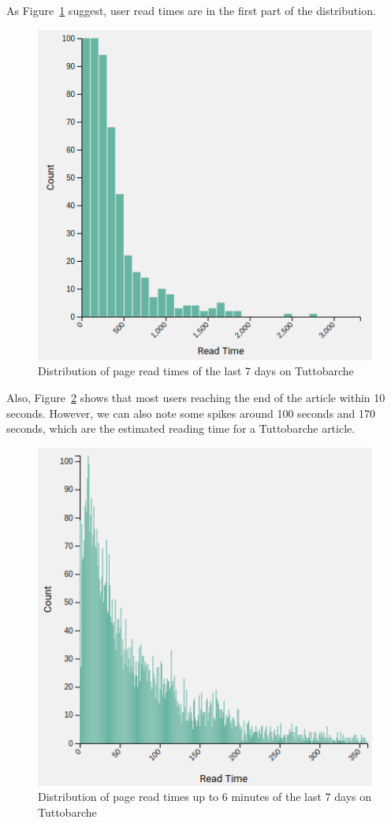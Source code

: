 \documentclass[sigconf,nonacm]{acmart}
\begin{document}
As Figure~\ref{fig:page-read-times-dist} suggest, user read times are in the
first part of the distribution.

\begin{figure}[h]
  \centering
  \includegraphics[width=0.8 \linewidth]{page-read-time-distribution.png}
  \caption{Distribution of page read times of the last 7 days on Tuttobarche}
  \label{fig:page-read-times-dist}
\end{figure}

Also, Figure~\ref{fig:page-read-times-dist-dense} shows that most users reaching the end
of the article within 10 seconds. However, we can also note some spikes around
100 seconds and 170 seconds, which are the estimated reading time for a
Tuttobarche article.

\begin{figure}[h]
  \centering
  \includegraphics[width=0.8 \linewidth]{page-read-time-distribution-dense.png}
  \caption{Distribution of page read times up to 6 minutes of the last 7 days on Tuttobarche}
  \label{fig:page-read-times-dist-dense}
\end{figure}
\end{document}
